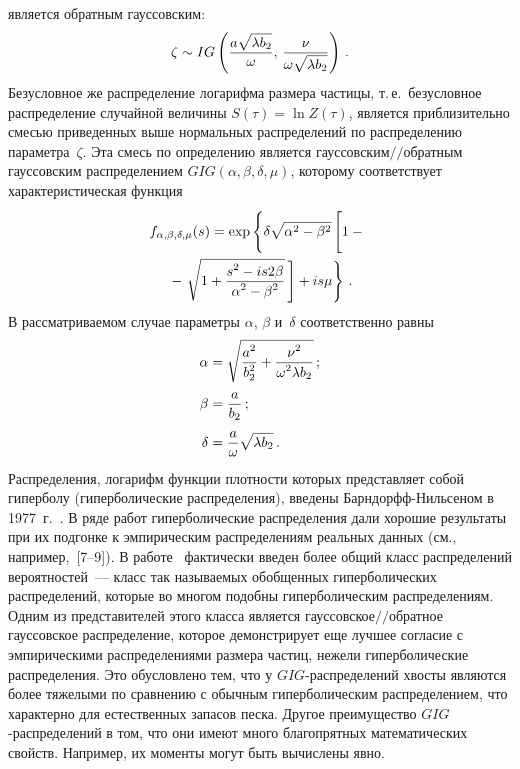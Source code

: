 \begin{multicols}{2}
является обратным гауссовским:
$$
\zeta \sim IG\left( \displaystyle\frac{\displaystyle a\sqrt{\lambda
b_{2}}\mathstrut}{\displaystyle \omega\mathstrut},\,\displaystyle\frac{\displaystyle \nu\mathstrut}{\displaystyle \omega\sqrt{\lambda b_{2}}\mathstrut}\right)\,.
$$
Безусловное же распределение логарифма размера частицы, т.\,е.\
безусловное распределение случайной величины $S(\tau)=\ln Z(\tau)$,
является приблизительно смесью приведенных выше нормальных
распределений по распределению параметра~$\zeta$. Эта смесь по
определению является гауссовским$/\!/$обратным гауссовским
распределением $GIG(\alpha,\beta,\delta,\mu)$, которому
соответствует характеристическая функция
\begin{multline*}
f_{\alpha,\beta,\delta,\mu}(s)=\exp\left\{\delta\sqrt{\alpha^{2}-\beta^{2}}
\left [\vphantom{\sqrt{1+\fr{s^{2}-is2\beta}{\alpha^{2}-\beta^{2}}}}
1-{}\vphantom{\sqrt{\fr{S^2}{\beta^2}}}\right.\right.\\
\left.{}-\left.\sqrt{1+\fr{s^{2}-is2\beta}{\alpha^{2}-\beta^{2}}}\,\right ]+is\mu\right\}\,.
\end{multline*}
В рассматриваемом случае параметры $\alpha$, $\beta$ и~$\delta$
соответственно равны
\begin{align*}
\alpha &= \sqrt{\displaystyle\frac{\displaystyle a^{2}\mathstrut}{\displaystyle b_{2}^{2}\mathstrut}+\displaystyle\frac{\displaystyle \nu^{2}\mathstrut}{\displaystyle \omega^{2}\lambda
b_{2}\mathstrut}}\,;\\
\beta &= \displaystyle\frac{\displaystyle a\mathstrut}{\displaystyle b_{2}\mathstrut}\,;\\
\delta &= \displaystyle\frac{\displaystyle a\mathstrut}{\displaystyle \omega\mathstrut}\sqrt{\lambda b_{2}}\,.
\end{align*}
Распределения, логарифм функции плотности которых представляет
собой гиперболу (гипер\-болические распределения), введены
Барндорфф-Ниль\-се\-ном в 1977~г.~\cite{6kk}. В ряде работ гиперболические
распределения дали хорошие результаты при их подгонке к
эмпирическим распределениям реальных данных (см., например,~[7--9]).
В работе~\cite{6kk} фактически введен более общий класс распределений
вероятностей~--- класс так называемых обобщенных гиперболических
распределений, которые во многом подобны гиперболическим
распределениям. Одним из представителей этого класса является
гауссовское$/\!/$обратное гауссовское распределение, которое
демонстрирует еще лучшее согласие с эмпирическими распределениями
размера час\-тиц, нежели гиперболические распределения. Это
обусловлено тем, что у $GIG$-распределений хвосты являются более
тяжелыми по сравнению с обычным гиперболическим распределением,
что характерно для естественных запасов песка. Другое преимущество
$GIG$-распределений в том, что они имеют много благопрятных
математических свойств. Например, их моменты могут быть вычислены
явно.


\end{multicols}
